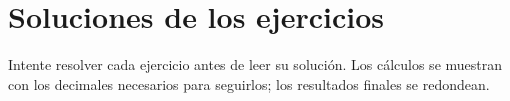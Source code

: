\chapter{Soluciones de los ejercicios}
Intente resolver cada ejercicio antes de leer su solución. Los cálculos se muestran con los decimales necesarios para seguirlos; los resultados finales se redondean.
